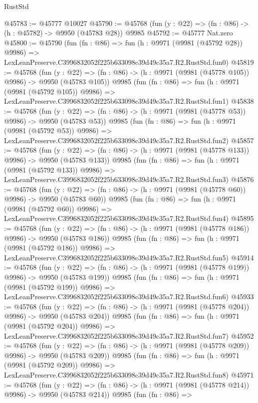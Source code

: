 \begin{lexlean}{RustStd}
\begin{coremodule}
@45783 := @45777 @10027
@45790 := @45768 (fun (y : @22) => (fn : @86) -> (h : @45782) -> @9950 (@45783 @28)) @9985
@45792 := @45777 Nat.zero
@45800 := @45790
    (fun (fn : @86) =>
    fun (h : @9971 (@9981 (@45792 @28)) @9986) =>
    LexLeanPreserve.C3996832052f225b633098c39d49c35a7.R2.RustStd.fun0)
@45819 := @45768
    (fun (y : @22) => (fn : @86) -> (h : @9971 (@9981 (@45778 @105)) @9986) -> @9950 (@45783 @105))
    @9985
    (fun (fn : @86) =>
    fun (h : @9971 (@9981 (@45792 @105)) @9986) =>
    LexLeanPreserve.C3996832052f225b633098c39d49c35a7.R2.RustStd.fun1)
@45838 := @45768
    (fun (y : @22) => (fn : @86) -> (h : @9971 (@9981 (@45778 @53)) @9986) -> @9950 (@45783 @53))
    @9985
    (fun (fn : @86) =>
    fun (h : @9971 (@9981 (@45792 @53)) @9986) =>
    LexLeanPreserve.C3996832052f225b633098c39d49c35a7.R2.RustStd.fun2)
@45857 := @45768
    (fun (y : @22) => (fn : @86) -> (h : @9971 (@9981 (@45778 @133)) @9986) -> @9950 (@45783 @133))
    @9985
    (fun (fn : @86) =>
    fun (h : @9971 (@9981 (@45792 @133)) @9986) =>
    LexLeanPreserve.C3996832052f225b633098c39d49c35a7.R2.RustStd.fun3)
@45876 := @45768
    (fun (y : @22) => (fn : @86) -> (h : @9971 (@9981 (@45778 @60)) @9986) -> @9950 (@45783 @60))
    @9985
    (fun (fn : @86) =>
    fun (h : @9971 (@9981 (@45792 @60)) @9986) =>
    LexLeanPreserve.C3996832052f225b633098c39d49c35a7.R2.RustStd.fun4)
@45895 := @45768
    (fun (y : @22) => (fn : @86) -> (h : @9971 (@9981 (@45778 @186)) @9986) -> @9950 (@45783 @186))
    @9985
    (fun (fn : @86) =>
    fun (h : @9971 (@9981 (@45792 @186)) @9986) =>
    LexLeanPreserve.C3996832052f225b633098c39d49c35a7.R2.RustStd.fun5)
@45914 := @45768
    (fun (y : @22) => (fn : @86) -> (h : @9971 (@9981 (@45778 @199)) @9986) -> @9950 (@45783 @199))
    @9985
    (fun (fn : @86) =>
    fun (h : @9971 (@9981 (@45792 @199)) @9986) =>
    LexLeanPreserve.C3996832052f225b633098c39d49c35a7.R2.RustStd.fun6)
@45933 := @45768
    (fun (y : @22) => (fn : @86) -> (h : @9971 (@9981 (@45778 @204)) @9986) -> @9950 (@45783 @204))
    @9985
    (fun (fn : @86) =>
    fun (h : @9971 (@9981 (@45792 @204)) @9986) =>
    LexLeanPreserve.C3996832052f225b633098c39d49c35a7.R2.RustStd.fun7)
@45952 := @45768
    (fun (y : @22) => (fn : @86) -> (h : @9971 (@9981 (@45778 @209)) @9986) -> @9950 (@45783 @209))
    @9985
    (fun (fn : @86) =>
    fun (h : @9971 (@9981 (@45792 @209)) @9986) =>
    LexLeanPreserve.C3996832052f225b633098c39d49c35a7.R2.RustStd.fun8)
@45971 := @45768
    (fun (y : @22) => (fn : @86) -> (h : @9971 (@9981 (@45778 @214)) @9986) -> @9950 (@45783 @214))
    @9985
    (fun (fn : @86) =>

\end{coremodule}
\end{lexlean}
